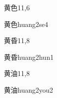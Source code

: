 \begin{entry}{黄色}{11,6}
  \begin{phonetics}{黄色}{huang2se4}
  \end{phonetics}
\end{entry}

\begin{entry}{黄昏}{11,8}
  \begin{phonetics}{黄昏}{huang2hun1}
  \end{phonetics}
\end{entry}

\begin{entry}{黄油}{11,8}
  \begin{phonetics}{黄油}{huang2you2}
  \end{phonetics}
\end{entry}



